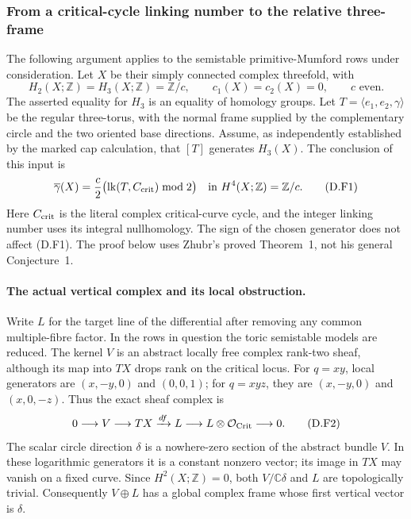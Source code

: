 \subsubsection*{From a critical-cycle linking number to the relative three-frame}

The following argument applies to the semistable primitive-Mumford rows
under consideration.  Let $X$ be their simply connected complex
threefold, with
\[
 H_2(X;\mathbb Z)=H_3(X;\mathbb Z)=\mathbb Z/c,
 \qquad c_1(X)=c_2(X)=0,
 \qquad c\text{ even}.
\]
The asserted equality for $H_3$ is an equality of homology groups.
Let $T=\langle e_1,e_2,\gamma\rangle$ be the regular three-torus,
with the normal frame supplied by the complementary circle and the
two oriented base directions.  Assume, as independently established
by the marked cap calculation, that $[T]$ generates $H_3(X)$.
The conclusion of this input is
\[
 \overline\gamma(X)=\frac c2
       \bigl(\operatorname{lk}(T,C_{\rm crit})\bmod2\bigr)
       \quad\text{in }H^4(X;\mathbb Z)=\mathbb Z/c.
 \tag{D.F1}
\]
Here $C_{\rm crit}$ is the literal complex critical-curve cycle, and
the integer linking number uses its integral nullhomology.  The sign
of the chosen generator does not affect (D.F1).  The proof below
uses Zhubr's proved Theorem~1, not his general Conjecture~1.

\paragraph{The actual vertical complex and its local obstruction.}
Write $L$ for the target line of the differential after removing any
common multiple-fibre factor.  In the rows in question the toric
semistable models are reduced.  The kernel $V$ is an abstract locally
free complex rank-two sheaf, although its map into $TX$ drops rank on
the critical locus.  For $q=xy$, local generators are
$(x,-y,0)$ and $(0,0,1)$; for $q=xyz$, they are
$(x,-y,0)$ and $(x,0,-z)$.  Thus the exact sheaf complex is
\[
 0\longrightarrow V\longrightarrow TX\xrightarrow{df}L
 \longrightarrow L\otimes\mathcal O_{\rm Crit}\longrightarrow0.
 \tag{D.F2}
\]
The scalar circle direction $\delta$ is a nowhere-zero section of
the abstract bundle $V$.  In these logarithmic generators it is a
constant nonzero vector; its image in $TX$ may vanish on a fixed
curve.  Since $H^2(X;\mathbb Z)=0$, both $V/\mathbb C\delta$ and
$L$ are topologically trivial.  Consequently
$V\oplus L$ has a global complex frame whose first vertical vector
is $\delta$.

